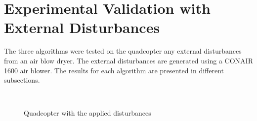 \documentclass[letterpaper%
, twoside%
, 12pt%
,memoire%
, english%
,creativecommons,hyperref%
]{thETS}
\begin{document}
\section{Experimental Validation with External Disturbances}
The three algorithms were tested on the quadcopter any external disturbances from an air blow dryer. The external disturbances are generated using a CONAIR 1600 air blower. The results for each algorithm are presented in different subsections.
\begin{figure}[H]
	\centering
	 \\ \parbox{0.75\textwidth}{\caption{{Quadcopter with the applied disturbances \label{Fig:dryer}}}}
\end{figure}
\end{document}
